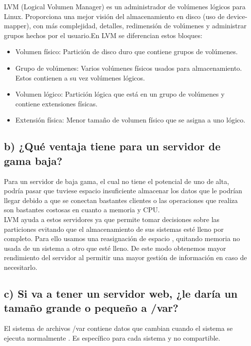 	LVM\cite{dieciseis,diecisiete,dieciocho}  (Logical Volumen Manager) es un administrador de volúmenes lógicos para Linux. Proporciona una mejor visión del almacenamiento en disco (uso de device-mapper), con más complejidad, detalles, redimensión de volúmenes y administrar grupos hechos por el usuario.En LVM se diferencian estos bloques:
	\begin{itemize}
		\item Volumen físico: Partición de disco duro que contiene grupos de volúmenes.
		\item Grupo de volúmenes: Varios volúmenes físicos usados para almacenamiento. Estos contienen a su vez volúmenes lógicos.
		\item Volumen lógico: Partición lógica que está en un grupo de volúmenes y contiene extensiones físicas.
		\item Extensión física: Menor tamaño de volumen físico que se asigna a uno lógico.
	\end{itemize}
	
	\subsection{b) ¿Qué ventaja tiene para un servidor de gama baja?}
	Para un servidor de baja gama, el cual no tiene el potencial de uno de alta, podría pasar que tuviese espacio insuficiente almacenar los datos que le podrían llegar debido a que se conectan bastantes clientes o las operaciones que realiza son bastantes costosas en cuanto a memoria y CPU.
	\\
	
	LVM ayuda a estos servidores ya que permite tomar decisiones sobre las particiones evitando que el almacenamiento de sus sistemas esté lleno por completo. Para ello usamos una reasignación de espacio\cite{diecinueve,veinte} , quitando memoria no usada de un sistema a otro que esté lleno. De este modo obtenemos mayor rendimiento del servidor al permitir una mayor gestión de información en caso de necesitarlo.
	
	\subsection{c) Si va a tener un servidor web, ¿le daría un tamaño grande o pequeño a /var?}
	El sistema de archivos /var contiene datos que cambian cuando el sistema se ejecuta normalmente \cite{veintiuna} . Es específico para cada sistema y no compartible.
	\\
	
